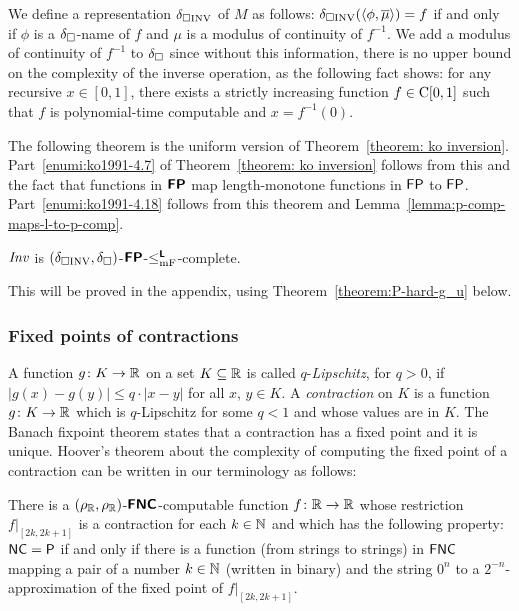 \documentclass[envcountsame,orivec,oribibl]{llncs}
\begin{document}
We define a representation $\delta _{\square \mathrm{INV}}$ of $M$ as follows:
$\delta _{\square \mathrm{INV}}(\langle \phi, \overline{\mu} \rangle) = f$ 
if and only if $\phi$ is a $\delta _\square$-name of $f$ 
and $\mu$ is a modulus of continuity of $f^{-1}$.
We add a modulus of continuity of $f^{-1}$ to $\delta _\square$
since without this information, there is no upper bound on 
the complexity of the inverse operation, 
as the following fact \cite[Theorem 4.4]{ko1991complexity} shows: 
for any recursive $x \in [0, 1]$, 
there exists a strictly increasing function $f \in \mathrm C[0, 1]$ 
such that $f$ is polynomial-time computable and $x = f^{-1}(0)$.

The following theorem is the uniform version of Theorem~\ref{theorem: ko inversion}. 
Part~\ref{enumi:ko1991-4.7} of Theorem~\ref{theorem: ko inversion} follows from this and the fact that
functions in $\text{\bfseries \sffamily \upshape FP}$ map length-monotone functions in $\mathsf{FP}$ to $\mathsf{FP}$.
Part~\ref{enumi:ko1991-4.18} follows from this theorem and Lemma~\ref{lemma:p-comp-maps-l-to-p-comp}.

\begin{theorem}
 \label{theorem:INV-is-P-complete}
 $\mathit{Inv}$ is $(\delta _{\square \mathrm{INV}}, \delta _\square)$-$\text{\bfseries \sffamily \upshape FP}$-$\leq _{\mathrm{mF}} ^{\text{\bfseries \sffamily \upshape L}}$-complete.
\end{theorem}

This will be proved in the appendix, 
using 
Theorem~\ref{theorem:P-hard-g_u} below. 

\subsubsection{Fixed points of contractions}

A function $g \colon K \to \mathbb R$ on a set $K \subseteq \mathbb R$
is called $q$-\emph{Lipschitz}, for $q > 0$, 
if $
\lvert g (x) - g (y) \rvert \leq q \cdot \lvert x - y \rvert
$ for all $x$, $y \in K$. 
A \emph{contraction} on $K$ is 
a function $g \colon K \to \mathbb R$ which is $q$-Lipschitz for some $q < 1$
and whose values are in $K$. 
The Banach fixpoint theorem states that 
a contraction has a fixed point and it is unique. 
Hoover's theorem about the complexity of computing the fixed point
of a contraction can be written in our terminology as follows:

\begin{theorem}
\label{theorem:hoover1991-4.5}
 There is a $(\rho _\mathbb R, \rho _\mathbb R)$-$\text{\bfseries \sffamily \upshape FNC}$-computable function $f \colon \mathbb R \to \mathbb R$
 whose restriction $f|_{[2k, 2k+1]}$ is a contraction for each $k \in \mathbb N$ and
 which has the following property: 
 $\mathsf{NC} = \mathsf{P}$ if and only if 
 there is a function (from strings to strings) in $\mathsf{FNC}$ mapping 
 a pair of a number $k \in \mathbb N$ (written in binary) and the string $0^n$
 to a $2^{-n}$-approximation of the 
 fixed point of $f |_{[2k, 2k + 1]}$. 
\end{theorem}
\end{document}
